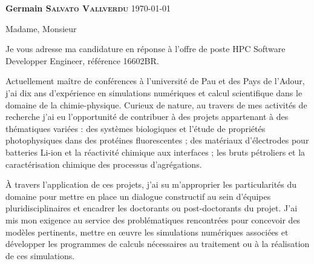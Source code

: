 \documentclass[11pt,a4paper,ragged2e]{../alta_letter}
\begin{document}
\name{}
\tagline{}


{\color{emphasis}\Large\bfseries Germain \textsc{Salvato Vallverdu}}
\hfill\today\par

\parbox{.5\textwidth}{\makecvheader}

\justify

\cvsection{~}

\setlength{\parindent}{0pt}
\setlength{\parskip}{1.5ex plus 0.5ex minus 0.5ex}

\bigskip

Madame, Monsieur

\medskip

Je vous adresse ma candidature en réponse à l'offre de poste HPC Software Developper Engineer, référence 16602BR.

Actuellement maître de conférences à l'université de Pau et des Pays de l'Adour, j'ai dix ans d'expérience en simulations numériques et calcul scientifique dans le domaine de la chimie-physique. Curieux de nature, au travers de mes activités de recherche j'ai eu l'opportunité de contribuer à des projets appartenant à des thématiques variées : des systèmes biologiques et l'étude de propriétés photophysiques dans des protéines fluorescentes ; des matériaux d'électrodes pour batteries Li-ion et la réactivité chimique aux interfaces ; les bruts pétroliers et la caractérisation chimique des processus d'agrégations.

À travers l'application de ces projets, j'ai su m'approprier les particularités du domaine pour mettre en place un dialogue constructif au sein d'équipes pluridisciplinaires et encadrer les doctorants ou post-doctorants du projet. J'ai mis mon exigence au service des problématiques rencontrées pour concevoir des modèles pertinents, mettre en œuvre les simulations numériques associées et développer les programmes de calculs nécessaires au traitement ou à la réalisation de ces simulations.
\end{document}
